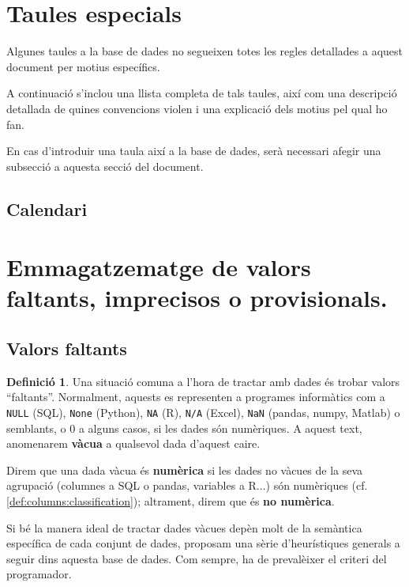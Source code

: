 \documentclass{article}
\theoremstyle{definition}
\newtheorem{definition}{Definició}
\begin{document}
\section{Taules especials}
Algunes taules a la base de dades no segueixen totes les regles detallades a aquest document per motius específics.

A continuació s'inclou una llista completa de tals taules, així com una descripció detallada de quines convencions violen i una explicació dels motius pel qual ho fan.

En cas d'introduir una taula així a la base de dades, serà necessari afegir una subsecció a aquesta secció del document.

\subsection{Calendari}\label{section:special:calendar}

\section{Emmagatzematge de valors faltants, imprecisos o provisionals.}\label{section:unclear_values}

\subsection{Valors faltants}\label{section:unclear_values:missing}
\begin{definition}
  Una situació comuna a l'hora de tractar amb dades és trobar valors ``faltants''. Normalment, aquests es representen a programes informàtics com a \verb|NULL| (SQL), \verb|None| (Python), \verb|NA| (R), \verb|N/A| (Excel), \verb|NaN| (pandas, numpy, Matlab) o semblants, o 0 a alguns casos, si les dades són numèriques. A aquest text, anomenarem \textbf{vàcua} a qualsevol dada d'aquest caire.

  Direm que una dada vàcua és \textbf{numèrica} si les dades no vàcues de la seva agrupació (columnes a SQL o pandas, variables a R...) són numèriques (cf. \cref{def:columns:classification}); altrament, direm que és \textbf{no numèrica}.
\end{definition}

Si bé la manera ideal de tractar dades vàcues depèn molt de la semàntica específica de cada conjunt de dades, proposam una sèrie d'heurístiques generals a seguir dins aquesta base de dades. Com sempre, ha de prevalèixer el criteri del programador.
\end{document}
